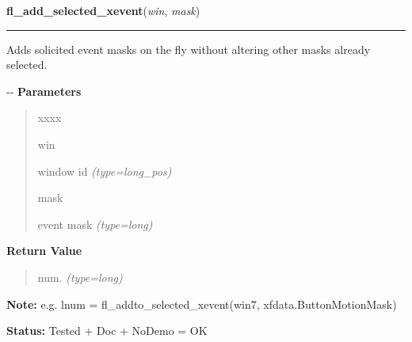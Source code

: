 \hspace{.8\funcindent}\begin{boxedminipage}{\funcwidth}

    \raggedright \textbf{fl\_add\_selected\_xevent}(\textit{win}, \textit{mask})

    \vspace{-1.5ex}

    \rule{\textwidth}{0.5\fboxrule}
\setlength{\parskip}{2ex}

Adds solicited event masks on the fly without altering other masks
already selected.

-{}-
\setlength{\parskip}{1ex}
      \textbf{Parameters}
      \vspace{-1ex}

      \begin{quote}
        \begin{Ventry}{xxxx}

          \item[win]


window id
            {\it (type=long\_pos)}

          \item[mask]


event mask
            {\it (type=long)}

        \end{Ventry}

      \end{quote}

      \textbf{Return Value}
    \vspace{-1ex}

      \begin{quote}

num.
      {\it (type=long)}

      \end{quote}

\textbf{Note:} 
e.g. lnum = fl\_addto\_selected\_xevent(win7, xfdata.ButtonMotionMask)


\textbf{Status:} 
Tested + Doc + NoDemo = OK


    \end{boxedminipage}

    \label{xformslib:flxbasic:fl_set_idle_delta}

    \vspace{0.5ex}


